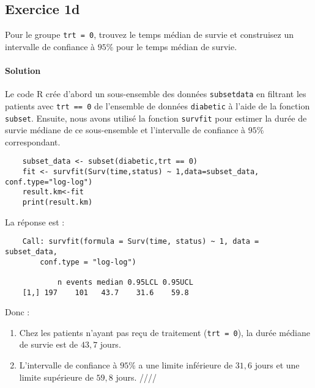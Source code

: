 \documentclass[../main.tex]{subfiles}
\begin{document}
\begin{CJK*}{UTF8}{gbsn}

\section*{Exercice 1d}
Pour le groupe \texttt{trt = 0}, trouvez le temps médian de survie et
construisez un intervalle de confiance à $95\%$ pour le temps médian de survie.
    
\paragraph{Solution}

Le code R crée d'abord un sous-ensemble des données \texttt{subsetdata} 
en filtrant les patients avec \texttt{trt == 0} de l'ensemble de données 
\texttt{diabetic} à l'aide de la fonction \texttt{subset}.
Ensuite, nous avons utilisé la fonction \texttt{survfit} 
pour estimer la durée de survie médiane de ce sous-ensemble 
et l'intervalle de confiance à $95\%$ correspondant.

\begin{lstlisting}
    subset_data <- subset(diabetic,trt == 0)
    fit <- survfit(Surv(time,status) ~ 1,data=subset_data, conf.type="log-log")
    result.km<-fit
    print(result.km)
\end{lstlisting}
    
La réponse est :
    
\begin{lstlisting}
    Call: survfit(formula = Surv(time, status) ~ 1, data = subset_data, 
        conf.type = "log-log")
        
            n events median 0.95LCL 0.95UCL
    [1,] 197    101   43.7    31.6    59.8
\end{lstlisting}

Donc :

\begin{enumerate}
    \item Chez les patients n'ayant pas reçu de traitement (\texttt{trt = 0}), la durée médiane de survie est de $43,7$ jours.
    \item L'intervalle de confiance à $95\%$ a une limite inférieure de $31,6$ jours et une limite supérieure de $59,8$ jours. ////
\end{enumerate}

\end{CJK*}
\end{document}

